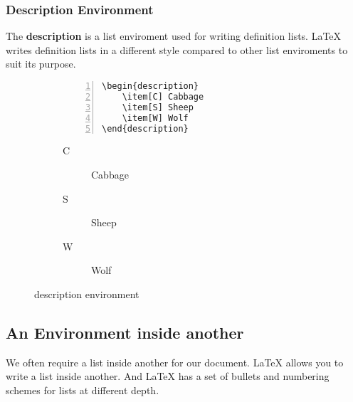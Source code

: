 \documentclass{article}
\begin{document}
\subsubsection{Description Environment}
The \textbf{description} is a list enviroment used for writing definition lists. \LaTeX{} writes definition lists in a different style compared to other list enviroments to suit its purpose.
\begin{figure}[h]
\centering
\begin{subfigure}{0.45\textwidth}
\begin{Verbatim}[numbers = left]
\begin{description}
	\item[C] Cabbage
	\item[S] Sheep
	\item[W] Wolf
\end{description}
\end{Verbatim}
\end{subfigure}
\begin{subfigure}{0.45\textwidth}
\begin{description}
	\item[C] Cabbage
	\item[S] Sheep
	\item[W] Wolf
\end{description}
\end{subfigure}
\caption{description environment}
\end{figure}

\subsection{An Environment inside another}
We often require a list inside another for our document. \LaTeX{} allows you to write a list inside another. And \LaTeX{} has a set of bullets and numbering schemes for lists at different depth.
\end{document}
